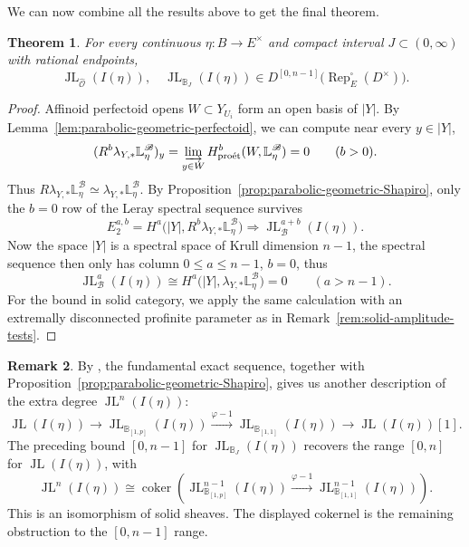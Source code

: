 \documentclass[11pt]{article}
\newtheorem{theorem}{Theorem}[section]
\theoremstyle{definition}
\newtheorem{remark}[theorem]{Remark}
\newcommand{\proet}{\mathrm{pro\acute et}}
\newcommand{\JL}{\operatorname{JL}}
\newcommand{\Rep}{\operatorname{Rep}}
\DeclareMathOperator{\coker}{coker}
\begin{document}
We can now combine all the results above to get the final theorem.
\begin{theorem}
\label{thm:principal-series-geometric-amplitude}
For every continuous \(\eta:B\to E^\times\) and compact
interval \(J\subset(0,\infty)\) with rational endpoints,
\begin{equation*}
 \JL_{\widehat{\mathscr O}}(I(\eta)),\quad
 \JL_{\mathbb B_J}(I(\eta))
 \in D^{[0,n-1]}\bigl(\Rep_E^\square(D^\times)\bigr).
\end{equation*}
\end{theorem}
\begin{proof}
Affinoid perfectoid opens \(W\subset Y_{U_i}\) form an open basis
of \(|Y|\).  By Lemma~\ref{lem:parabolic-geometric-perfectoid},
we can compute near every \(y\in|Y|\),
\begin{equation*}
 (R^b\lambda_{Y,*}\mathbb L_\eta^{\mathscr B})_y
 =\varinjlim_{y\in W}
 H^b_{\proet}(W,\mathbb L_\eta^{\mathscr B})=0
 \qquad(b>0).
\end{equation*}
Thus \(R\lambda_{Y,*}\mathbb L_\eta^{\mathscr B}
\simeq\lambda_{Y,*}\mathbb L_\eta^{\mathscr B}\).  By
Proposition~\ref{prop:parabolic-geometric-Shapiro}, only the $b=0$ row of the Leray
spectral sequence survives
\begin{equation*}
 E_2^{a,b}=H^a\bigl(|Y|,R^b\lambda_{Y,*}
                                  \mathbb L_\eta^{\mathscr B}\bigr)
 \Longrightarrow\JL_{\mathscr B}^{a+b}(I(\eta)).
\end{equation*}
Now the space $|Y|$ is a spectral space of Krull dimension $n-1$, the spectral sequence then only has column $0\le a\le n-1$, $b=0$, thus
\begin{equation*}
 \JL_{\mathscr B}^a(I(\eta))
 \cong H^a\bigl(|Y|,\lambda_{Y,*}\mathbb L_\eta^{\mathscr B}\bigr)
 =0\qquad(a>n-1).
\end{equation*}
For the bound in solid category, we apply the same calculation with an
extremally disconnected profinite parameter as in Remark~\ref{rem:solid-amplitude-tests}.
\end{proof}

\begin{remark}
By \cite[proof of Theorem~7.2.1, Step~1]{DRC}, the
fundamental exact sequence, together with
Proposition~\ref{prop:parabolic-geometric-Shapiro}, gives us
another description of the extra degree $\JL^n(I(\eta))$: 
\begin{equation*}
 \JL(I(\eta))\longrightarrow
 \JL_{\mathbb B_{[1,p]}}(I(\eta))
 \xrightarrow{\varphi-1}
 \JL_{\mathbb B_{[1,1]}}(I(\eta))
 \longrightarrow\JL(I(\eta))[1].
\end{equation*}
The preceding bound \([0,n-1]\) for $\JL_{\mathbb{B}_J}(I(\eta))$ recovers the 
range \([0,n]\) for $\JL(I(\eta))$, with
\begin{equation*}
 \JL^n(I(\eta))\cong
 \coker\!\left(
 \JL_{\mathbb B_{[1,p]}}^{n-1}(I(\eta))
 \xrightarrow{\varphi-1}
 \JL_{\mathbb B_{[1,1]}}^{n-1}(I(\eta))\right).
\end{equation*}
This is an isomorphism of solid sheaves. The displayed cokernel is
the remaining obstruction to the \([0,n-1]\) range.
\end{remark}


\printbibliography[heading=bibintoc]
\end{document}
